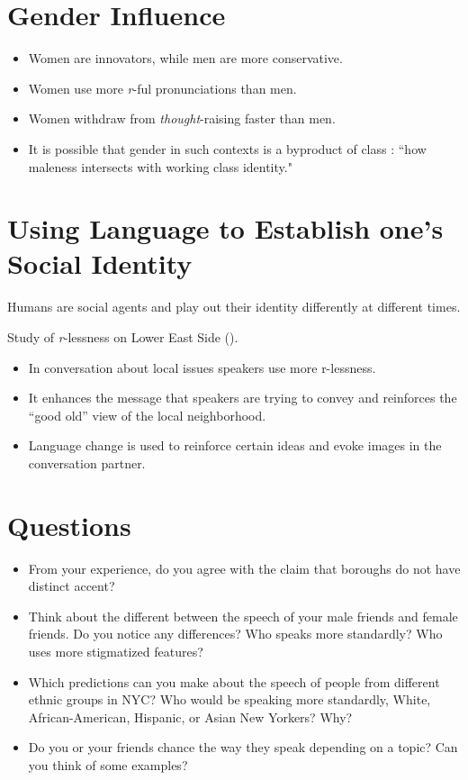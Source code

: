 \documentclass[11pt]{article}
\newcommand{\1}{$'$}
\newcommand{\2}{$''$}
\newcommand{\3}{$'''$}
\begin{document}
\section{Gender Influence}

\begin{itemize}
	\item Women are innovators, while men are more conservative.
	\item Women use more \emph{r}-ful pronunciations than men.
	\item Women withdraw from \emph{thought}-raising faster than men.
	\item It is possible that gender in such contexts is a byproduct of class	: ``how maleness intersects with working class identity."
\end{itemize}

\section{Using Language to Establish one's Social Identity}

Humans are social agents and play out their identity differently at different times.

\noindent Study of \emph{r}-lessness on Lower East Side (\citealp{Becker:2009}). 

\begin{itemize}
\item In conversation about local issues speakers use more r-lessness.
\item It enhances the message that speakers are trying to convey and reinforces the ``good old'' view of the local neighborhood.
\item Language change is used to reinforce certain ideas and evoke images in the conversation partner.
\end{itemize}

\section{Questions}

\begin{itemize}
\item From your experience, do you agree with the claim that boroughs do not have distinct accent?
\item Think about the different between the speech of your male friends and female friends. Do you notice any differences? Who speaks more standardly? Who uses more stigmatized features?
\item Which predictions can you make about the speech of people from different ethnic groups in NYC? Who would be speaking more standardly, White, African-American, Hispanic, or Asian New Yorkers? Why?
\item Do you or your friends chance the way they speak depending on a topic? Can you think of some examples?
\end{itemize}




\end{document}
